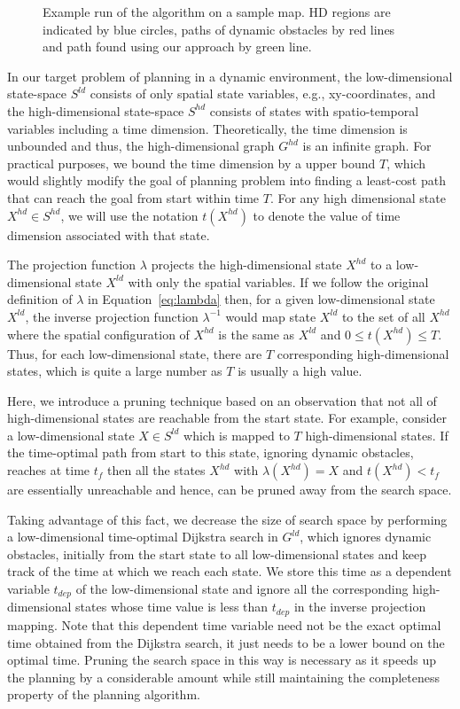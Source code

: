 \begin{figure}[ht]
  \caption{Example run of the algorithm on a sample map. HD regions are indicated by blue circles, paths of dynamic obstacles by red lines and path found using our approach by green line.}
  \label{fig:alg}
\end{figure}

In our target problem of planning in a dynamic environment,
the low-dimensional state-space $S^{ld}$ consists of only spatial state variables, e.g., xy-coordinates, and the high-dimensional state-space $S^{hd}$ consists of states with spatio-temporal variables including a time dimension. Theoretically, the time dimension is unbounded and thus, the high-dimensional graph $G^{hd}$ is an infinite graph. For practical purposes, we bound the time dimension by a upper bound $T$, which would slightly modify the goal of planning problem into finding a least-cost path that can reach the goal from start within time $T$.
For any high dimensional state $X^{hd} \in S^{hd}$, we will use the notation $t(X^{hd})$ to denote the value of time dimension associated with that state. 

The projection function $\lambda$ projects the high-dimensional state $X^{hd}$ to a low-dimensional state $X^{ld}$ with only the spatial variables. 
If we follow the original definition of $\lambda$ in Equation~\ref{eq:lambda} then, for a given low-dimensional state $X^{ld}$, the inverse projection function $\lambda^{-1}$ would map state $X^{ld}$ to the set of all $X^{hd}$ where the spatial configuration of $X^{hd}$ is the same as $X^{ld}$ and $0 \leq t(X^{hd}) \leq T$. 
Thus, for each low-dimensional state, there are $T$ corresponding high-dimensional states, which is quite a large number as $T$ is usually a high value. 

Here, we introduce a pruning technique based on an observation that not all of high-dimensional states are reachable from the start state. For example, consider a low-dimensional state $X \in S^{ld}$ which is mapped to $T$ high-dimensional states. If the time-optimal path from start to this state, ignoring dynamic obstacles, reaches at time $t_f$ then all the states $X^{hd}$ with $\lambda(X^{hd}) = X$ and $t(X^{hd}) < t_f$ are essentially unreachable and hence, can be pruned away from the search space. 

Taking advantage of this fact, we decrease the size of search space by performing a low-dimensional time-optimal Dijkstra search in $G^{ld}$, which ignores dynamic obstacles, initially from the start state to all low-dimensional states and keep track of the time at which we reach each state. 
We store this time as a dependent variable $t_{dep}$ of the low-dimensional state and ignore all the corresponding high-dimensional states whose time value is less than $t_{dep}$ in the inverse projection mapping. 
Note that this dependent time variable need not be the exact optimal time obtained from the Dijkstra search, it just needs to be a lower bound on the optimal time. Pruning the search space in this way is necessary as it speeds up the planning by a considerable amount while still maintaining the completeness property of the planning algorithm. 


